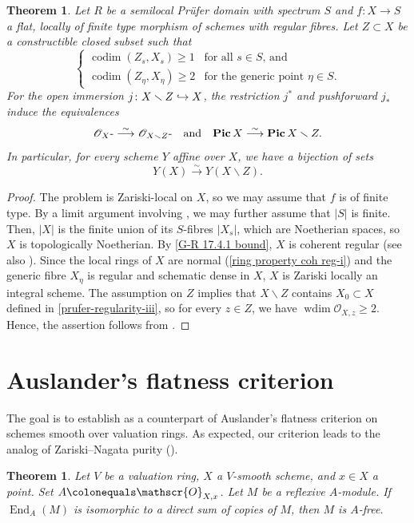 \documentclass[JEP,XML,SOM,Unicode,published]{cedram}
\newcommand{\NoChangel}[1]{%
\expandafter\let\csname old\string#1\endcsname=#1
\let#1=\relax
\newcommand{#1}{\mathop{\mathcode`l="716C\csname old\string#1\endcsname\mathcode`l="7160}\nolimits}%
}
\newcommand\hto{\mathrel{\lhook\joinrel\to}}
\let\backslash\smallsetminus
\newcommand{\Rflx}{\mathbf{Rflx}}\NoChangel{\Rflx}
\newcommand{\sO}{\mathscr{O}}
\let\hra\hto
\let\ce\colonequals
\let\x\text
\let\q\quad
\newcommand{\isoto}{\overset{\sim}{\longrightarrow}}
\providecommand{\abs}[1]{\left\lvert#1\right\rvert}
\DeclareMathOperator{\wdim}{wdim}
\DeclareMathOperator{\End}{End}
\DeclareMathOperator{\codim}{codim}
\newcommand{\bpf}{\begin{proof}}
\newcommand{\epf}{\end{proof}}
\newcommand{\bthm}{\begin{thm}}
\newcommand{\ethm}{\end{thm}}
\theoremstyle{plain}
\newtheorem{thm}[subsection]{Theorem}
\newtheorem{thm-tweak}[subsection]{Theorem}
\theoremstyle{definition}
\begin{document}
\bthm\label{equiv-cats}
Let $R$ be a semilocal Prüfer domain with spectrum $S$ and $f\colon X\to S$ a flat, {locally} of finite type morphism of {schemes} with regular fibres.
Let $Z\subset X$ be a constructible closed subset such that
\[
\begin{cases}
\codim(Z_s,X_s)\geq 1 & \text{for all $s\in S$, and}\\
\codim(Z_{\eta},X_{\eta})\geq 2 & \text{for the generic point $\eta\in S$}.
\end{cases}
\]
For the open immersion $j\colon X\backslash Z\hra X$, the restriction $j^{\ast}$ and pushforward $j_{\ast}$ induce the equivalences
\[
\sO_X\x{-}\Rflx\isoto \sO_{X\backslash Z}\x{-}\Rflx\q \text{and} \q \mathbf{Pic}\,X\isoto \mathbf{Pic}\,X\backslash Z.
\]
In particular, {for} every scheme $Y$ affine over $X$, we have a bijection of sets
\[
Y(X)\isoto Y(X\backslash Z).
\]
\ethm
\bpf
The problem is Zariski-local on $X$, so we may assume that $f$ is of finite type. By a limit argument involving , we may further assume that $|S|$ is finite.
Then, $\abs{X}$ is the finite union of its $S$-fibres $\abs{X_s}$, which are Noetherian spaces, so $X$ is topologically Noetherian.
By \eqref{G-R 17.4.1 bound}, $X$ is coherent regular (see also ).
Since the local rings of $X$ are normal (\eqref{ring property coh reg-i}) and the generic fibre $X_{\eta}$ is regular and schematic dense in $X$, $X$ is Zariski locally an integral scheme.
The assumption on $Z$ implies that $X\backslash Z$ contains $X_0\subset X$ defined in \eqref{prufer-regularity-iii}, so for every $z\in Z$, we have $\wdim \sO_{X,z}\geq 2$.
Hence, the assertion follows from .
\epf

\section{Auslander's flatness criterion}
The goal is to establish  as a counterpart of Auslander's flatness criterion \cite[Th.\,1.3]{Aus62} on schemes smooth over valuation rings.
As expected, our criterion leads to the analog of Zariski--Nagata purity ().
\begin{thm-tweak} \label{Auslander's flatness criterion}
Let $V$ be a valuation ring, $X$ a $V$-smooth scheme, and $x\in X$ a point. Set $A\ce \sO_{X,x}$. Let $M$ be a reflexive $A$\nobreakdash-mod\-ule. If $\End_A(M)$ is isomorphic to a direct sum of copies of $M$, then $M$ is $A$-free.
\end{thm-tweak}
\end{document}
